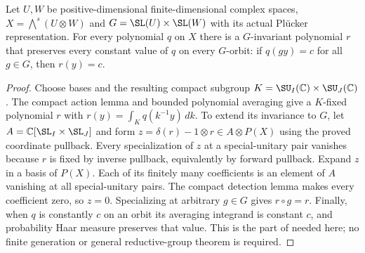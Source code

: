 \begin{lemma}
\label{lem:balanced-polynomial-average}
\leanok
{}
Let $U,W$ be positive-dimensional finite-dimensional complex spaces,
$X=\bigwedge^s(U\otimes W)$ and $G=\SL(U)\times\SL(W)$ with its
actual Pl\"ucker representation. For every polynomial $q$ on $X$ there
is a $G$-invariant polynomial $r$ that preserves every constant value
of $q$ on every $G$-orbit: if $q(gy)=c$ for all $g\in G$, then $r(y)=c$.
\end{lemma}
\begin{proof}
Choose bases and the resulting compact subgroup
$K=\SU_I(\mathbb C)\times\SU_J(\mathbb C)$. The compact action lemma
and bounded polynomial averaging give a $K$-fixed polynomial $r$ with
$r(y)=\int_K q(k^{-1}y)\,dk$. To extend its invariance to $G$, let
$A=\mathbb C[\SL_I\times\SL_J]$ and form
$z=\delta(r)-1\otimes r\in A\otimes P(X)$ using the proved coordinate
pullback. Every specialization of $z$ at a special-unitary pair vanishes
because $r$ is fixed by inverse pullback, equivalently by forward pullback.
Expand $z$ in a basis of $P(X)$. Each of its finitely many coefficients
is an element of $A$ vanishing at all special-unitary pairs. The compact
detection lemma makes every coefficient zero, so $z=0$. Specializing at
arbitrary $g\in G$ gives $r\circ g=r$. Finally, when $q$ is constantly
$c$ on an orbit its averaging integrand is constant $c$, and probability
Haar measure preserves that value. This is the part of
\cite[Theorem 5.6]{maithani-reynolds} needed here; no finite generation or
general reductive-group theorem is required.
\end{proof}

